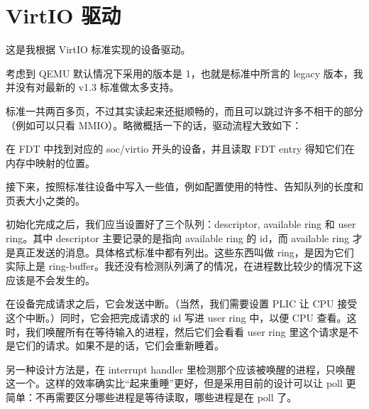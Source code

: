 \section{VirtIO 驱动}
\label{sec:virtio}

这是我根据 VirtIO 标准\cite{virtio}实现的设备驱动。

考虑到 QEMU 默认情况下采用的版本是 1，也就是标准中所言的 legacy 版本，我并没有对最新的 v1.3 标准做太多支持。

标准一共两百多页，不过其实读起来还挺顺畅的，而且可以跳过许多不相干的部分（例如可以只看 MMIO）。略微概括一下的话，驱动流程大致如下：

在 FDT 中找到对应的 soc/virtio 开头的设备，并且读取 FDT entry 得知它们在内存中映射的位置。

接下来，按照标准往设备中写入一些值，例如配置使用的特性、告知队列的长度和页表大小之类的。

初始化完成之后，我们应当设置好了三个队列：descriptor, available ring 和 user ring。其中 descriptor 主要记录的是指向 available ring 的 id，而 available ring 才是真正发送的消息。具体格式标准中都有列出。这些东西叫做 ring，是因为它们实际上是 ring-buffer。我还没有检测队列满了的情况，在进程数比较少的情况下这应该是不会发生的。

在设备完成请求之后，它会发送中断。（当然，我们需要设置 PLIC 让 CPU 接受这个中断。）同时，它会把完成请求的 id 写进 user ring 中，以便 CPU 查看。这时，我们唤醒所有在等待输入的进程，然后它们会看看 user ring 里这个请求是不是它们的请求。如果不是的话，它们会重新睡着。

另一种设计方法是，在 interrupt handler 里检测那个应该被唤醒的进程，只唤醒这一个。这样的效率确实比“起来重睡”更好，但是采用目前的设计可以让 poll 更简单：不再需要区分哪些进程是等待读取，哪些进程是在 poll 了。
